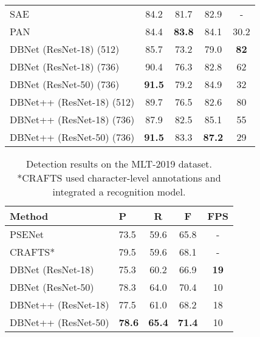 \begin{table}[ht]
\begin{tabularx}{1.0\linewidth}{lc*{3}c}
SAE~\cite{tian2019learning}        & 84.2          & 81.7          & 82.9          & -       \\ 
PAN~\cite{wang2019efficient}        & 84.4          & \textbf{83.8}          & 84.1          & 30.2       \\ 
\midrule  
DBNet (ResNet-18) (512)~\cite{LiaoWYCB20} & 85.7          & 73.2          & 79.0          & \textbf{82} \\ 
DBNet (ResNet-18) (736)~\cite{LiaoWYCB20} & 90.4          & 76.3          & 82.8          & 62 \\ 
DBNet (ResNet-50) (736)~\cite{LiaoWYCB20} & \textbf{91.5} & 79.2 & 84.9 & 32          \\  
\midrule  
DBNet++ (ResNet-18) (512) & 89.7   & 76.5   & 82.6  & 80 \\ 
DBNet++ (ResNet-18) (736) & 87.9   & 82.5   & 85.1  & 55 \\ 
DBNet++ (ResNet-50) (736) & \textbf{91.5}   & 83.3   & \textbf{87.2}   & 29  \\  
\bottomrule
\end{tabularx}
\label{tab:td500}
\end{table}

\begin{table}[!ht]
\setlength{\tabcolsep}{12.0pt}
\centering
\caption{Detection results on the MLT-2019 dataset. *CRAFTS used character-level annotations and integrated a recognition model.}
\begin{tabularx}{1.0\linewidth}{ll*{3}c}
\toprule
Method        & P             & R             & F             & FPS         \\ \midrule
PSENet~\cite{wang2019shape}          & 73.5            & 59.6            & 65.8            & -         \\ 
CRAFTS*~\cite{baek2020character}          & 79.5          & 59.6          & 68.1          & -        \\ 
\midrule  
DBNet (ResNet-18)~\cite{LiaoWYCB20} & 75.3          & 60.2          & 66.9          & \textbf{19} \\ 
DBNet (ResNet-50)~\cite{LiaoWYCB20} & 78.3 & 64.0 & 70.4 & 10 \\ 
\midrule  
DBNet++ (ResNet-18) & 77.5    & 61.0    & 68.2     & 18 \\ 
DBNet++ (ResNet-50) & \textbf{78.6} & \textbf{65.4}  & \textbf{71.4} & 10 \\ 
\bottomrule
\end{tabularx}
\label{tab:mlt19}
\end{table}




